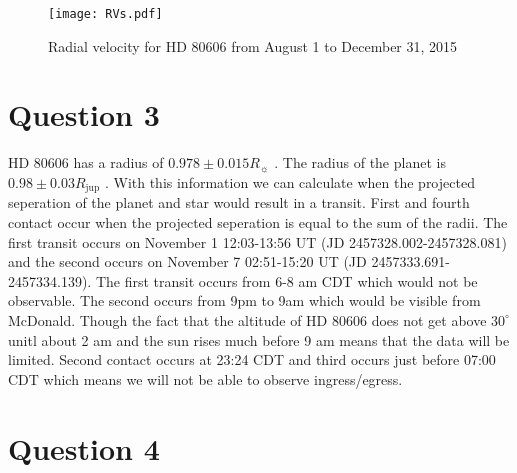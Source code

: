 \documentclass[preprint]{aastex}
\begin{document}
\begin{figure}[h]
\begin{center}
    \texttt{[image: RVs.pdf]}
    \caption{Radial velocity for HD 80606 from August 1 to December 31, 2015}
    \label{fig:RV}
\end{center}
\end{figure}

\section{Question 3}

HD 80606 has a radius of $0.978\pm0.015 R_\sun$ \citep{orbparam}. The radius of the planet is $0.98\pm0.03 R_\mathrm{jup}$ \citep{orbparam}. With this information we can calculate when the projected seperation of the planet and star would result in a transit. First and fourth contact occur when the projected seperation is equal to the sum of the radii. The first transit occurs on November 1 12:03-13:56 UT (JD 2457328.002-2457328.081) and the second occurs on November 7 02:51-15:20 UT (JD 2457333.691-2457334.139). The first transit occurs from 6-8 am CDT which would not be observable. The second occurs from 9pm to 9am which would be visible from McDonald. Though the fact that the altitude of HD 80606 does not get above $30^\circ$ unitl about 2 am and the sun rises much before 9 am means that the data will be limited. Second contact occurs at 23:24 CDT and third occurs just before 07:00 CDT which means we will not be able to observe ingress/egress.

\section{Question 4}
\end{document}
